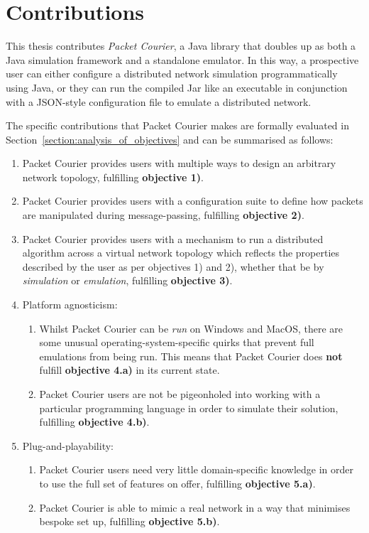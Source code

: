 \section{Contributions}\label{section:contributions}

This thesis contributes \emph{Packet Courier}, a Java library that doubles up as both a Java simulation framework and
a standalone emulator. In this way, a prospective user can either configure a distributed network simulation
programmatically using Java, or they can run the compiled Jar like an executable in conjunction with a JSON-style
configuration file to emulate a distributed network.

The specific contributions that Packet Courier makes are formally evaluated in
Section~\ref{section:analysis_of_objectives} and can be summarised as follows:
\begin{enumerate}
    \item Packet Courier provides users with multiple ways to design an arbitrary network topology, fulfilling
    \textbf{objective 1)}.
    \item Packet Courier provides users with a configuration suite to define how packets are manipulated during
    message-passing, fulfilling \textbf{objective 2)}.
    \item Packet Courier provides users with a mechanism to run a distributed algorithm across a virtual network
    topology which reflects the properties described by the user as per objectives 1) and 2), whether that be by
    \emph{simulation} or \emph{emulation}, fulfilling \textbf{objective 3)}.
    \item Platform agnosticism:
    \begin{enumerate}
        \item Whilst Packet Courier can be \emph{run} on Windows and MacOS, there are some unusual
        operating-system-specific quirks that prevent full emulations from being run. This means that Packet Courier
        does \textbf{not} fulfill \textbf{objective 4.a)} in its current state.
        \item Packet Courier users are not be pigeonholed into working with a particular programming language in
        order to simulate their solution, fulfilling \textbf{objective 4.b)}.
    \end{enumerate}
    \item Plug-and-playability:
    \begin{enumerate}
        \item Packet Courier users need very little domain-specific knowledge in order to use the full set of
        features on offer, fulfilling \textbf{objective 5.a)}.
        \item Packet Courier is able to mimic a real network in a way that minimises bespoke set up, fulfilling
        \textbf{objective 5.b)}.
    \end{enumerate}
\end{enumerate}
